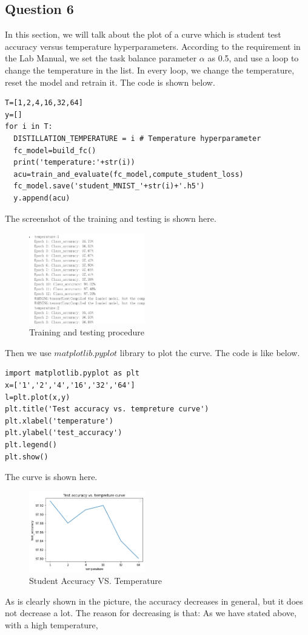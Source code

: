 \documentclass[conference]{IEEEtran}
\begin{document}
\subsection{Question 6}
In this section, we will talk about the plot of a curve which is student test accuracy versus temperature hyperparameters. 
According to the requirement in the Lab Manual, we set the task balance parameter $\alpha$ as 0.5, and use a loop to change the temperature in the list.
In every loop, we change the temperature, reset the model and retrain it. The code is shown below.
\begin{lstlisting}
T=[1,2,4,16,32,64]
y=[]
for i in T:
  DISTILLATION_TEMPERATURE = i # Temperature hyperparameter
  fc_model=build_fc()
  print('temperature:'+str(i))
  acu=train_and_evaluate(fc_model,compute_student_loss)
  fc_model.save('student_MNIST_'+str(i)+'.h5')
  y.append(acu)
\end{lstlisting}
The screenshot of the training and testing is shown here.
\begin{figure}[h] 
    \centering
    \includegraphics[width=0.45\textwidth]{./graphs/T1Q6_train.png}
    \caption{Training and testing procedure}
    \label{Fig.t1q3e}
\end{figure}
Then we use $matplotlib.pyplot$ library to plot the curve.
The code is like below.
\begin{lstlisting}
import matplotlib.pyplot as plt
x=['1','2','4','16','32','64']
l=plt.plot(x,y)
plt.title('Test accuracy vs. tempreture curve')
plt.xlabel('temperature')
plt.ylabel('test_accuracy')
plt.legend()
plt.show()
\end{lstlisting}
The curve is shown here.
\begin{figure}[h] 
    \centering
    \includegraphics[width=0.45\textwidth]{./graphs/accuracy_vs_temperature.png}
    \caption{Student Accuracy VS. Temperature}
    \label{Fig.t1q3e}
\end{figure}
As is clearly shown in the picture, the accuracy decreases in general, but it does not decrease a lot.
The reason for decreasing is that: As we have stated above, with a high temperature,
\end{document}
